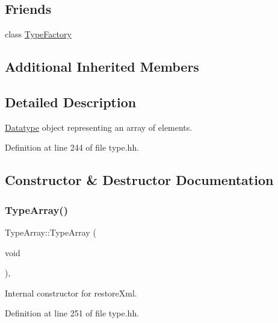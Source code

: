 \subsection*{Friends}
\begin{DoxyCompactItemize}
\item 
class \mbox{\hyperlink{class_type_array_ac8c1945d0a63785e78b3e09a13226ed6}{Type\+Factory}}
\end{DoxyCompactItemize}
\subsection*{Additional Inherited Members}


\subsection{Detailed Description}
\mbox{\hyperlink{class_datatype}{Datatype}} object representing an array of elements. 

Definition at line 244 of file type.\+hh.



\subsection{Constructor \& Destructor Documentation}
\mbox{\label{class_type_array_aac83422d9146a17dc25463d8b3cd483a}} 
\subsubsection{\texorpdfstring{TypeArray()}{TypeArray()}\hspace{0.1cm}{\footnotesize\ttfamily [1/3]}}
{\footnotesize\ttfamily Type\+Array\+::\+Type\+Array (\begin{DoxyParamCaption}\item[{void}]{ }\end{DoxyParamCaption})\hspace{0.3cm}{\ttfamily [inline]}, {\ttfamily [protected]}}



Internal constructor for restore\+Xml. 



Definition at line 251 of file type.\+hh.

